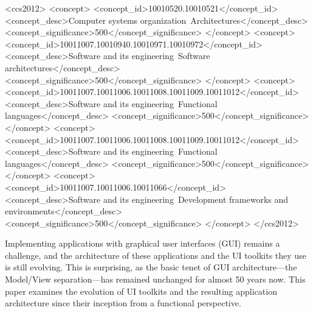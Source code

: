 \documentclass[sigplan,screen]{acmart}
\begin{document}
\begin{CCSXML}
<ccs2012>
   <concept>
       <concept_id>10010520.10010521</concept_id>
       <concept_desc>Computer systems organization~Architectures</concept_desc>
       <concept_significance>500</concept_significance>
       </concept>
   <concept>
       <concept_id>10011007.10010940.10010971.10010972</concept_id>
       <concept_desc>Software and its engineering~Software architectures</concept_desc>
       <concept_significance>500</concept_significance>
       </concept>
   <concept>
       <concept_id>10011007.10011006.10011008.10011009.10011012</concept_id>
       <concept_desc>Software and its engineering~Functional languages</concept_desc>
       <concept_significance>500</concept_significance>
       </concept>
   <concept>
       <concept_id>10011007.10011006.10011008.10011009.10011012</concept_id>
       <concept_desc>Software and its engineering~Functional languages</concept_desc>
       <concept_significance>500</concept_significance>
       </concept>
    <concept>
        <concept_id>10011007.10011006.10011066</concept_id>
        <concept_desc>Software and its engineering~Development frameworks and environments</concept_desc>
        <concept_significance>500</concept_significance>
    </concept>
</ccs2012>
\end{CCSXML}



\maketitle

Implementing applications with graphical user interfaces (GUI) remains
a challenge, and the architecture of these applications and the UI
toolkits they use is still evolving.  This is surprising, as the basic
tenet of GUI architecture---the Model/View separation---has remained
unchanged for almost 50 years now.
This paper examines the evolution of UI toolkits and the resulting
application architecture since their inception from a functional
perspective.
\end{document}
